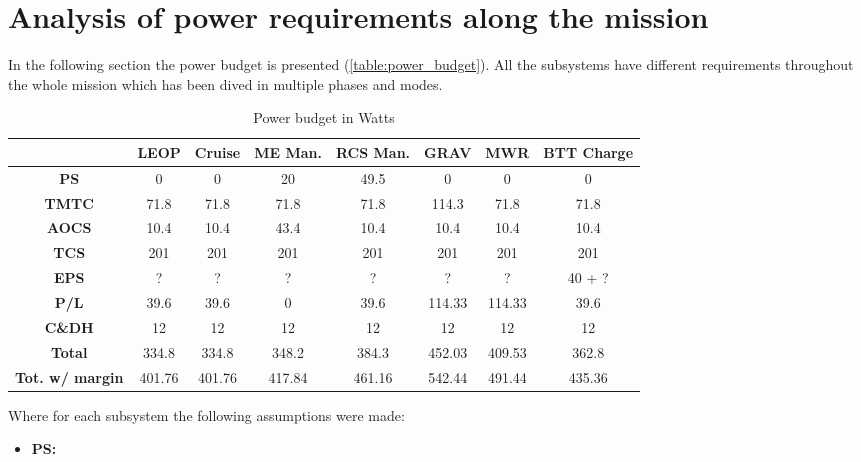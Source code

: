 \section{Analysis of power requirements along the mission}
\label{sec:EPS_phases}

In the following section the power budget is presented (\autoref{table:power_budget}). All the subsystems have different requirements throughout the whole mission which has been dived in multiple phases and modes. 
\begin{table}[H]
    \renewcommand{\arraystretch}{1.5}
    \centering
    \begin{tabular}{|c|c|c|c|c|c|c|c|}
        \hline
        & \textbf{LEOP} & \textbf{Cruise} & \textbf{ME Man.} & \textbf{RCS Man.} & \textbf{GRAV} & \textbf{MWR} & \textbf{BTT Charge} \\
        \hline
        \hline
        \textbf{PS} & 0 & 0 & 20 & 49.5 & 0 & 0 & 0 \\
        \hline
        \textbf{TMTC} & 71.8 & 71.8 & 71.8 & 71.8 & 114.3 & 71.8 & 71.8 \\
        \hline
        \textbf{AOCS} & 10.4 & 10.4 & 43.4 & 10.4 & 10.4 & 10.4 & 10.4 \\
        \hline
        \textbf{TCS} & 201 & 201 & 201 & 201 & 201 & 201 & 201 \\
        \hline
        \textbf{EPS} & ? & ? & ? & ? & ? & ? & 40 + ? \\
        \hline
        \textbf{P/L} & 39.6 & 39.6 & 0 & 39.6 & 114.33 & 114.33 & 39.6 \\
        \hline
        \textbf{C\&DH} & 12 & 12 & 12 & 12 & 12 & 12 & 12 \\
        \hline
        \hline
        \textbf{Total} & 334.8 & 334.8 & 348.2 & 384.3 & 452.03 & 409.53 & 362.8 \\
        \hline
        \textbf{Tot. w/ margin} & 401.76 & 401.76 & 417.84 & 461.16 & 542.44 & 491.44 & 435.36 \\
        \hline
    \end{tabular}
    \caption{Power budget in Watts}
    \label{table:power_budget}
\end{table}  

Where for each subsystem the following assumptions were made:
\begin{itemize}
    \item \textbf{PS:} 
\end{itemize}